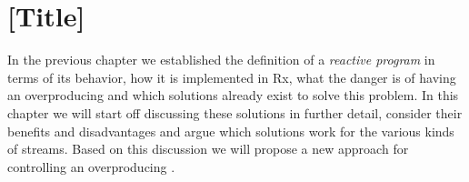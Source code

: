 \chapter{[Title]}
In the previous chapter we established the definition of a \textit{reactive program} in terms of its behavior, how it is implemented in Rx, what the danger is of having an overproducing \obs and which solutions already exist to solve this problem. In this chapter we will start off discussing these solutions in further detail, consider their benefits and disadvantages and argue which solutions work for the various kinds of streams. Based on this discussion we will propose a new approach for controlling an overproducing \obs.



